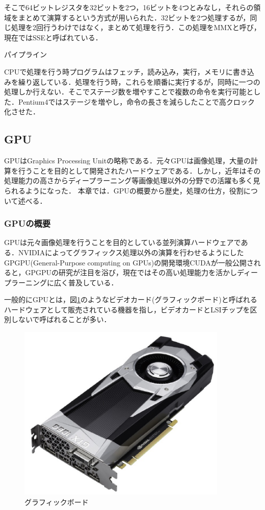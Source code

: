 \documentclass[a4j,12pt]{jsarticle}
\begin{document}
そこで64ビットレジスタを32ビットを2つ，16ビットを4つとみなし，それらの領域をまとめて演算するという方式が用いられた．32ビットを2つ処理するが，同じ処理を2回行うわけではなく，まとめて処理を行う．この処理をMMXと呼び，現在ではSSEと呼ばれている．


\begin{Large}
パイプライン
\end {Large}

CPUで処理を行う時プログラムはフェッチ，読み込み，実行，メモリに書き込みを繰り返している．処理を行う時，これらを順番に実行するが，同時に一つの処理しか行えない．そこでステージ数を増やすことで複数の命令を実行可能とした．Pentium4ではステージを増やし，命令の長さを減らしたことで高クロック化させた．


\subsection{GPU}
GPUはGraphics Processing Unitの略称である．元々GPUは画像処理，大量の計算を行うことを目的として開発されたハードウェアである．しかし，近年はその処理能力の高さからディープラーニング等画像処理以外の分野での活躍も多く見られるようになった．
本章では．GPUの概要から歴史，処理の仕方，役割について述べる．


\subsubsection{GPUの概要}
GPUは元々画像処理を行うことを目的としている並列演算ハードウェアである．NVIDIAによってグラフィックス処理以外の演算を行わせるようにしたGPGPU(General-Purpose computing on GPUs)の開発環境CUDAが一般公開されると，GPGPUの研究が注目を浴び，現在ではその高い処理能力を活かしディープラーニングに広く普及している．

一般的にGPUとは，図\ref{fig:gpu}のようなビデオカード(グラフィックボード)と呼ばれるハードウェアとして販売されている機器を指し，ビデオカードとLSIチップを区別しないで呼ばれることが多い．

\begin{figure}[htbp]
 \begin{center}
  \includegraphics[width=100mm]{GPU.pdf}
 \end{center}
 \caption{グラフィックボード}
 \label{fig:gpu}
\end{figure}
\end{document}
